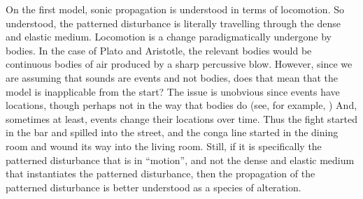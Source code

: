 \documentclass[12pt]{article}
\begin{document}
On the first model, sonic propagation is understood in terms of locomotion. So understood, the patterned disturbance is literally travelling through the dense and elastic medium. Locomotion is a change paradigmatically undergone by bodies. In the case of Plato and Aristotle, the relevant bodies would be continuous bodies of air produced by a sharp percussive blow. However, since we are assuming that sounds are events and not bodies, does that mean that the model is inapplicable from the start? The issue is unobvious since events have locations, though perhaps not in the way that bodies do (see, for example, \citealt{Davidson:1969da}) And, sometimes at least, events change their locations over time. Thus the fight started in the bar and spilled into the street, and the conga line started in the dining room and wound its way into the living room. Still, if it is specifically the patterned disturbance that is in ``motion'', and not the dense and elastic medium that instantiates the patterned disturbance, then the propagation of the patterned disturbance is better understood as a species of alteration.
\end{document}
